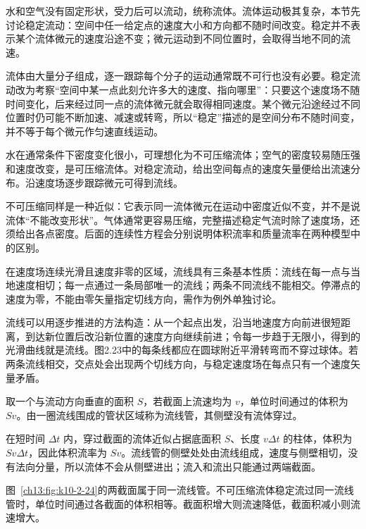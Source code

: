 \label{ch13:sec:flow-intro}

水和空气没有固定形状，受力后可以流动，统称流体。流体运动极其复杂，本节先讨论稳定流动：空间中任一给定点的速度大小和方向都不随时间改变。稳定并不表示某个流体微元的速度沿途不变；微元运动到不同位置时，会取得当地不同的流速。

流体由大量分子组成，逐一跟踪每个分子的运动通常既不可行也没有必要。稳定流动改为考察“空间中某一点此刻允许多大的速度、指向哪里”：只要这个速度场不随时间变化，后来经过同一点的流体微元就会取得相同速度。某个微元沿途经过不同位置时仍可能不断加速、减速或转弯，所以“稳定”描述的是空间分布不随时间变，并不等于每个微元作匀速直线运动。

水在通常条件下密度变化很小，可理想化为不可压缩流体；空气的密度较易随压强和速度改变，是可压缩流体。对稳定流动，给出空间每点的速度矢量便给出流速分布。沿速度场逐步跟踪微元可得到流线。

不可压缩同样是一种近似：它表示同一流体微元在运动中密度近似不变，并不是说流体“不能改变形状”。气体通常更容易压缩，完整描述稳定气流时除了速度场，还须给出各点密度。后面的连续性方程会分别说明体积流率和质量流率在两种模型中的区别。

\SphereStreamlinesDiagram

在速度场连续光滑且速度非零的区域，流线具有三条基本性质：流线在每一点与当地速度相切；每一点通过一条局部唯一的流线；两条不同流线不能相交。停滞点的速度为零，不能由零矢量指定切线方向，需作为例外单独讨论。

流线可以用逐步推进的方法构造：从一个起点出发，沿当地速度方向前进很短距离，到达新位置后改沿新位置的速度方向继续前进；令每一步趋于无限小，得到的光滑曲线就是流线。图2.23中的每条线都应在圆球附近平滑转弯而不穿过球体。若两条流线相交，交点处会出现两个切线方向，与稳定速度场在每点只有一个速度矢量矛盾。

取一个与流动方向垂直的面积 $S$，若截面上流速均为 $v$，单位时间通过的体积为 $Sv$。由一圈流线围成的管状区域称为流线管，其侧壁没有流体穿过。

在短时间 $\Delta t$ 内，穿过截面的流体近似占据底面积 $S$、长度 $v\Delta t$ 的柱体，体积为 $Sv\Delta t$，因此体积流率为 $Sv$。流线管的侧壁处处由流线组成，速度与侧壁相切，没有法向分量，所以流体不会从侧壁进出；流入和流出只能通过两端截面。

\StreamtubeDiagram

图~\ref{ch13:fig:k10-2-24}的两截面属于同一流线管。不可压缩流体稳定流过同一流线管时，单位时间通过各截面的体积相等。截面积增大则流速降低，截面积减小则流速增大。

